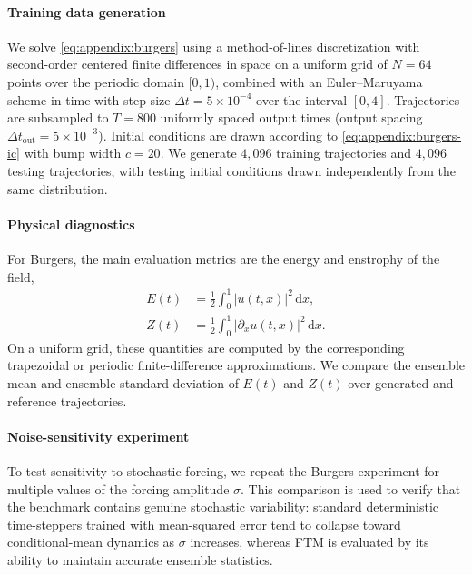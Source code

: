 \documentclass[oneside,11pt]{article}
\theoremstyle{remark}
\begin{document}
\paragraph{Training data generation} 
We solve \eqref{eq:appendix:burgers} using a method-of-lines discretization with second-order centered finite differences in space on a uniform grid of $N = 64$ points over the periodic domain $[0,1)$, combined with an Euler--Maruyama scheme in time with step size $\Delta t = 5\times 10^{-4}$
over the interval $[0, 4]$. Trajectories are subsampled to $T = 800$ uniformly spaced output times (output spacing $\Delta t_{\text{out}} = 5\times 10^{-3}$). Initial conditions are drawn according to \eqref{eq:appendix:burgers-ic} with bump width $c = 20$. We generate $4{,}096$ training trajectories and $4{,}096$ testing trajectories, with testing initial conditions drawn independently from the same distribution.

\paragraph{Physical diagnostics}
For Burgers, the main evaluation metrics are the energy and enstrophy of the
field,
\begin{align}
    E(t)
    &=
    \frac12
    \int_0^1
    |u(t,x)|^2\,\mathrm dx,
    \\
    Z(t)
    &=
    \frac12
    \int_0^1
    |\partial_x u(t,x)|^2\,\mathrm dx.
\end{align}
On a uniform grid, these quantities are computed by the corresponding
trapezoidal or periodic finite-difference approximations.  We compare the ensemble mean and ensemble standard deviation of $E(t)$ and $Z(t)$ over
generated and reference trajectories.

\paragraph{Noise-sensitivity experiment}
To test sensitivity to stochastic forcing, we repeat the Burgers experiment
for multiple values of the forcing amplitude $\sigma$.  This comparison is
used to verify that the benchmark contains genuine stochastic variability:
standard deterministic time-steppers trained with mean-squared error tend to
collapse toward conditional-mean dynamics as $\sigma$ increases, whereas FTM
is evaluated by its ability to maintain accurate ensemble statistics.
\end{document}
